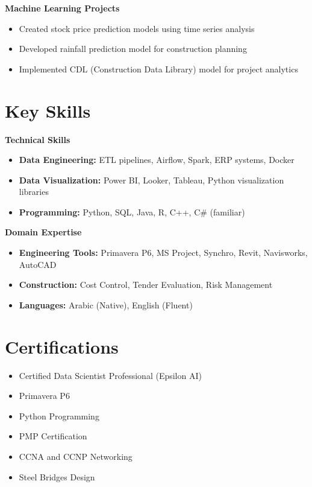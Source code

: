 \documentclass[10pt, letterpaper]{article}
\begin{document}
\begin{mdframed}[style=cvframe]
\begin{multicols}{2}
\textbf{Machine Learning Projects}
\begin{itemize}[leftmargin=*]
    \item Created stock price prediction models using time series analysis
    \item Developed rainfall prediction model for construction planning
    \item Implemented CDL (Construction Data Library) model for project analytics
\end{itemize}

\columnbreak

\section{Key Skills}
\textbf{\textcolor{primaryColor}{Technical Skills}}
\begin{itemize}[leftmargin=*]
    \item \textbf{Data Engineering:} ETL pipelines, Airflow, Spark, ERP systems, Docker
    \item \textbf{Data Visualization:} Power BI, Looker, Tableau, Python visualization libraries
    \item \textbf{Programming:} Python, SQL, Java, R, C++, C\# (familiar)
\end{itemize}

\textbf{\textcolor{primaryColor}{Domain Expertise}}
\begin{itemize}[leftmargin=*]
    \item \textbf{Engineering Tools:} Primavera P6, MS Project, Synchro, Revit, Navisworks, AutoCAD
    \item \textbf{Construction:} Cost Control, Tender Evaluation, Risk Management
    \item \textbf{Languages:} Arabic (Native), English (Fluent)
\end{itemize}

\section{Certifications}
\begin{itemize}[leftmargin=*]
    \item Certified Data Scientist Professional (Epsilon AI)
    \item Primavera P6
    \item Python Programming
    \item PMP Certification
    \item CCNA and CCNP Networking
    \item Steel Bridges Design
\end{itemize}


\end{multicols}
\end{mdframed}
\end{document}
